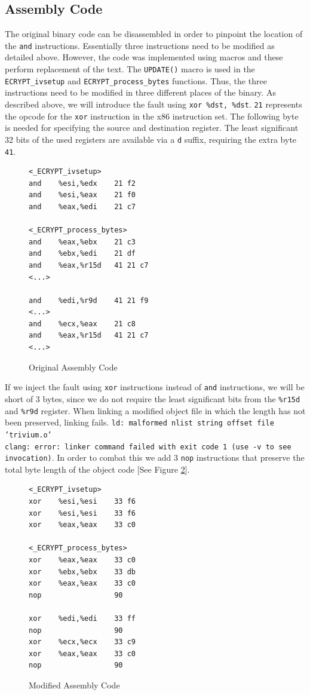 \documentclass[conference]{IEEEtran}
\newcommand{\code}[1]{\texttt{#1}}
\begin{document}
\subsection{Assembly Code}
The original binary code can be disassembled in order to pinpoint the location of the \code{and} instructions. Essentially three instructions need to be modified as detailed above. However, the code was implemented using macros and these perform replacement of the text. The \code{UPDATE()} macro is used in the \code{ECRYPT\_ivsetup} and \code{ECRYPT\_process\_bytes} functions. Thus, the three instructions need to be modified in three different places of the binary. As described above, we will introduce the fault using \code{xor \%dst, \%dst}. \code{21} represents the opcode for the \code{xor} instruction in the x86 instruction set. The following byte is needed for specifying the source and destination register. The least significant 32 bits of the used registers are available via a \code{d} suffix, requiring the extra byte \code{41}.
\begin{figure}[H]
\begin{lstlisting}[style=asm, frame=tlrb]
<_ECRYPT_ivsetup>
and    %esi,%edx    21 f2
and    %esi,%eax    21 f0
and    %eax,%edi    21 c7

<_ECRYPT_process_bytes>
and    %eax,%ebx    21 c3
and    %ebx,%edi    21 df  
and    %eax,%r15d   41 21 c7
<...>

and    %edi,%r9d    41 21 f9
<...>
and    %ecx,%eax    21 c8
and    %eax,%r15d   41 21 c7
<...>
\end{lstlisting}
\caption{Original Assembly Code}\label{fig:orgi-asm}
\end{figure}

If we inject the fault using \code{xor} instructions instead of \code{and} instructions, we will be short of 3 bytes, since we do not require the least significant bits from the \code{\%r15d} and \code{\%r9d} register. When linking a modified object file in which the length has not been preserved, linking fails. \code{ld: malformed nlist string offset file 'trivium.o'\\clang: error: linker command failed with exit code 1 (use -v to see invocation)}. In order to combat this we add 3 \code{nop} instructions that preserve the total byte length of the object code [See Figure \ref{fig:mod-asm}].

\begin{figure}[H]
\begin{lstlisting}[style=asm, frame=tlrb]
<_ECRYPT_ivsetup>
xor    %esi,%esi    33 f6
xor    %esi,%esi    33 f6
xor    %eax,%eax    33 c0

<_ECRYPT_process_bytes>
xor    %eax,%eax    33 c0
xor    %ebx,%ebx    33 db 
xor    %eax,%eax    33 c0
nop                 90

xor    %edi,%edi    33 ff
nop                 90
xor    %ecx,%ecx    33 c9
xor    %eax,%eax    33 c0
nop                 90
\end{lstlisting}
\caption{Modified Assembly Code}\label{fig:mod-asm}
\end{figure}
\end{document}
